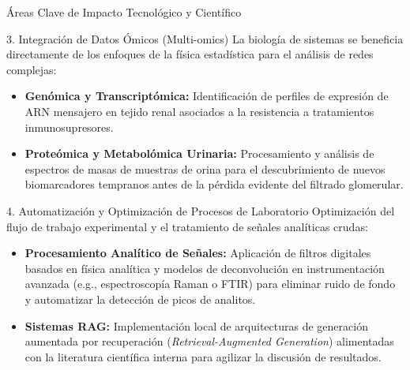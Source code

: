 \documentclass[12pt,letterpaper]{article}
\begin{document}
\begin{infobox}{Áreas Clave de Impacto Tecnológico y Científico}
    \vspace{0.2cm}

    \begin{subbox}{3. Integración de Datos Ómicos (Multi-omics)}
    La biología de sistemas se beneficia directamente de los enfoques de la física estadística para el análisis de redes complejas:
    \begin{itemize}[leftmargin=*, label=\textcolor{secondarycolor}{\textbullet}]
        \item \textbf{Genómica y Transcriptómica:} Identificación de perfiles de expresión de ARN mensajero en tejido renal asociados a la resistencia a tratamientos inmunosupresores.
        \item \textbf{Proteómica y Metabolómica Urinaria:} Procesamiento y análisis de espectros de masas de muestras de orina para el descubrimiento de nuevos biomarcadores tempranos antes de la pérdida evidente del filtrado glomerular.
    \end{itemize}
    \end{subbox}

    \vspace{0.2cm}

    \begin{subbox}{4. Automatización y Optimización de Procesos de Laboratorio}
    Optimización del flujo de trabajo experimental y el tratamiento de señales analíticas crudas:
    \begin{itemize}[leftmargin=*, label=\textcolor{secondarycolor}{\textbullet}]
        \item \textbf{Procesamiento Analítico de Señales:} Aplicación de filtros digitales basados en física analítica y modelos de deconvolución en instrumentación avanzada (e.g., espectroscopía Raman o FTIR) para eliminar ruido de fondo y automatizar la detección de picos de analitos.
        \item \textbf{Sistemas RAG:} Implementación local de arquitecturas de generación aumentada por recuperación (\emph{Retrieval-Augmented Generation}) alimentadas con la literatura científica interna para agilizar la discusión de resultados.
    \end{itemize}
    \end{subbox}

\end{infobox}

\vspace{0.4cm}
\end{document}
